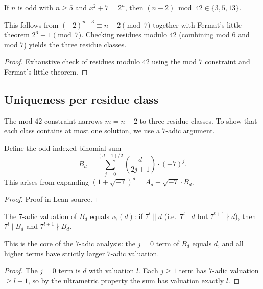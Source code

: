 \begin{theorem}
  \label{thm:odd_case_only_three_values_mod_42}
  \leanok
  If $n$ is odd with $n \geq 5$ and $x^2 + 7 = 2^n$, then
  $(n - 2) \bmod 42 \in \{3, 5, 13\}$.

  This follows from $(-2)^{n-3} \equiv n - 2 \pmod{7}$ together with
  Fermat's little theorem $2^6 \equiv 1 \pmod{7}$. Checking residues modulo $42$
  (combining mod $6$ and mod $7$) yields the three residue classes.
\end{theorem}
\begin{proof}\leanok
  Exhaustive check of residues modulo $42$ using the mod $7$ constraint
  and Fermat's little theorem.
\end{proof}

\subsection{Uniqueness per residue class}

The mod $42$ constraint narrows $m = n - 2$ to three residue classes.
To show that each class contains at most one solution, we use a $7$-adic argument.

\begin{definition}
  \label{def:binomial_B}
  \leanok
  Define the odd-indexed binomial sum
  \[
    B_d = \sum_{j=0}^{(d-1)/2} \binom{d}{2j+1} \cdot (-7)^j.
  \]
  This arises from expanding $(1+\sqrt{-7})^d = A_d + \sqrt{-7} \cdot B_d$.
\end{definition}
\begin{proof}\leanok
  Proof in Lean source.
\end{proof}

\begin{lemma}
  \label{lem:lemma_A_binomial_valuation}
  \leanok
  The $7$-adic valuation of $B_d$ equals $v_7(d)$: if $7^l \| d$
  (i.e.\ $7^l \mid d$ but $7^{l+1} \nmid d$), then $7^l \mid B_d$
  and $7^{l+1} \nmid B_d$.

  This is the core of the $7$-adic analysis: the $j=0$ term of $B_d$ equals $d$,
  and all higher terms have strictly larger $7$-adic valuation.
\end{lemma}
\begin{proof}\leanok
  The $j=0$ term is $d$ with valuation $l$. Each $j \geq 1$ term has
  $7$-adic valuation $\geq l+1$, so by the ultrametric property the
  sum has valuation exactly $l$.
\end{proof}

